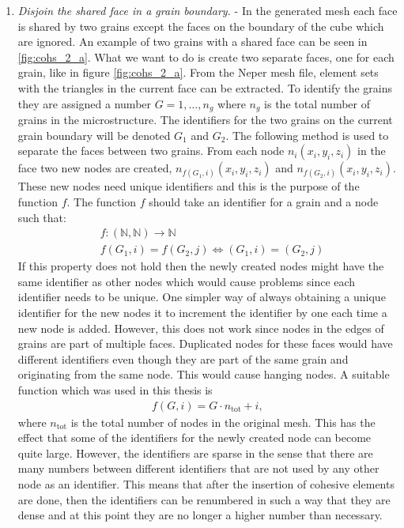 \documentclass[grain_boundary_law.tex]{subfiles}
\begin{document}
\begin{enumerate}
\item \textit{Disjoin the shared face in a grain boundary.} - In the generated mesh each face is shared by two grains except the faces on the boundary of the cube which are ignored. An example of two grains with a shared face can be seen in \ref{fig:cohs_2_a}. What we want to do is create two separate faces, one for each grain, like in figure \ref{fig:cohs_2_a}. From the Neper mesh file, element sets with the triangles in the current face can be extracted. To identify the grains they are assigned a number $G = 1,\ldots , n_g$ where $n_g$ is the total number of grains in the microstructure. The identifiers for the two grains on the current grain boundary will be denoted $G_1$ and $G_2$. The following method is used to separate the faces between two grains. From each node $n_i (x_i, y_i, z_i)$ in the face two new nodes are created, $n_{f(G_1,i)} (x_i, y_i, z_i)$ and $n_{f(G_2,i)} (x_i, y_i, z_i)$. These new nodes need unique identifiers and this is the purpose of the function $f$. The function $f$ should take an identifier for a grain and a node such that:
%
\begin{align}&  f: (\mathbb{N},\mathbb{N}) \rightarrow \mathbb{N} \\
 & f(G_1, i) = f(G_2, j) \Leftrightarrow (G_1, i) = (G_2, j) 
\end{align}
%
If this property does not hold then the newly created nodes might have the same identifier as other nodes which would cause problems since each identifier needs to be unique. One simpler way of always obtaining a unique identifier for the new nodes it to increment the identifier by one each time a new node is added. However, this does not work since nodes in the edges of grains are part of multiple faces. Duplicated nodes for these faces would have different identifiers even though they are part of the same grain and originating from the same node. This would cause hanging nodes. A suitable function which was used in this thesis is
%
\begin{align} 
  f(G, i) = G \cdot n_\text{tot} + i,
\end{align}
%
where $n_\text{tot}$ is the total number of nodes in the original mesh. This has the effect that some of the identifiers for the newly created node can become quite large. However, the identifiers are sparse in the sense that there are many numbers between different identifiers that are not used by any other node as an identifier. This means that after the insertion of cohesive elements are done, then the identifiers can be renumbered in such a way that they are dense and at this point they are no longer a higher number than necessary.


\end{enumerate}
\end{document}
